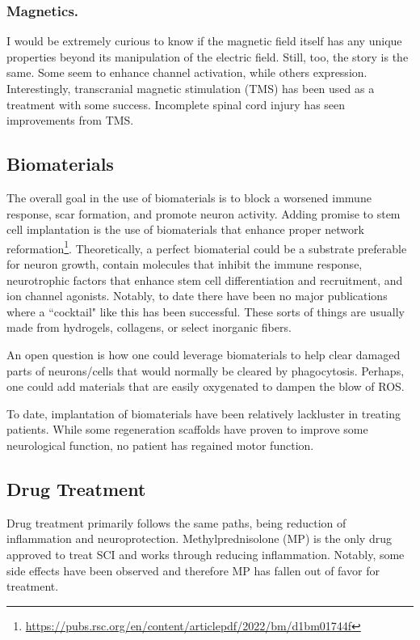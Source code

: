 \subsubsection{Magnetics.}
I would be extremely curious to know if the magnetic field itself has any unique properties beyond its manipulation of the electric field. Still, too, the story is the same. Some seem to enhance channel activation, while others expression. Interestingly, transcranial magnetic stimulation (TMS) has been used as a treatment with some success. Incomplete spinal cord injury has seen improvements from TMS. 

\subsection{Biomaterials}
The overall goal in the use of biomaterials is to block a worsened immune response, scar formation, and promote neuron activity. Adding promise to stem cell implantation is the use of biomaterials that enhance proper network reformation\footnote{\url{https://pubs.rsc.org/en/content/articlepdf/2022/bm/d1bm01744f}}. Theoretically, a perfect biomaterial could be a substrate preferable for neuron growth, contain molecules that inhibit the immune response, neurotrophic factors that enhance stem cell differentiation and recruitment, and ion channel agonists. Notably, to date there have been no major publications where a ``cocktail" like this has been successful. These sorts of things are usually made from hydrogels, collagens, or select inorganic fibers.\newline

An open question is how one could leverage biomaterials to help clear damaged parts of neurons/cells that would normally be cleared by phagocytosis. Perhaps, one could add materials that are easily oxygenated to dampen the blow of ROS.\newline

To date, implantation of biomaterials have been relatively lackluster in treating patients. While some regeneration scaffolds have proven to improve some neurological function, no patient has regained motor function. 

\subsection{Drug Treatment}
Drug treatment primarily follows the same paths, being reduction of inflammation and neuroprotection. Methylprednisolone (MP) is the only drug approved to treat SCI and works through reducing inflammation. Notably, some side effects have been observed and therefore MP has fallen out of favor for treatment. 

